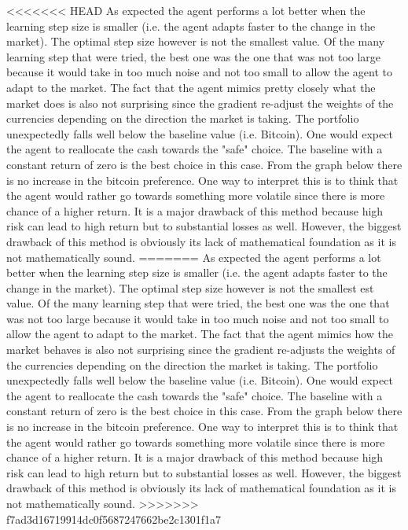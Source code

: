 \documentclass[a4paper,12pt]{article}
\begin{document}
<<<<<<< HEAD
As expected the agent performs a lot better when the learning step size is smaller (i.e. the agent adapts faster to the change in the market).  The optimal step size however is not the smallest value. Of the many learning step that were tried, the best one was the one that was not too large because it would take in too much noise and not too small to allow the agent to adapt to the market. The fact that the agent mimics pretty closely what the market does is also not surprising since the gradient re-adjust the weights of the currencies depending on the direction the market is taking. The portfolio unexpectedly falls well below the baseline value (i.e. Bitcoin). One would expect the agent to reallocate the cash towards the "safe" choice. The baseline with a constant return of zero is the best choice in this case. From the graph below there is no increase in the bitcoin preference. One way to interpret this is to think that the agent would rather go towards something more volatile since there is more chance of a higher return. It is a major drawback of this method because high risk can lead to high return but to substantial losses as well. However, the biggest drawback of this method is obviously its lack of mathematical foundation as it is not mathematically sound.
=======
As expected the agent performs a lot better when the learning step size is smaller (i.e. the agent adapts faster to the change in the market).  The optimal step size however is not the smallest est value. Of the many learning step that were tried, the best one was the one that was not too large because it would take in too much noise and not too small to allow the agent to adapt to the market. The fact that the agent mimics how the market behaves is also not surprising since the gradient re-adjusts the weights of the currencies depending on the direction the market is taking. The portfolio unexpectedly falls well below the baseline value (i.e. Bitcoin). One would expect the agent to reallocate the cash towards the "safe" choice. The baseline with a constant return of zero is the best choice in this case. From the graph below there is no increase in the bitcoin preference. One way to interpret this is to think that the agent would rather go towards something more volatile since there is more chance of a higher return. It is a major drawback of this method because high risk can lead to high return but to substantial losses as well. However, the biggest drawback of this method is obviously its lack of mathematical foundation as it is not mathematically sound.
>>>>>>> f7ad3d16719914dc0f5687247662be2c1301f1a7
\end{document}
